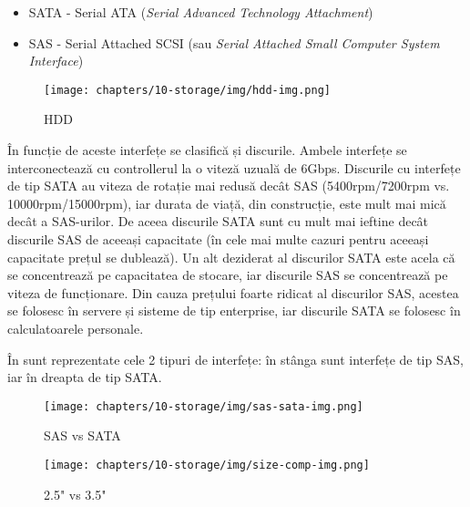 \begin{itemize}
	\item SATA - Serial ATA  (\textit{Serial Advanced Technology Attachment})
	\item SAS - Serial Attached SCSI  (sau
          \textit{Serial Attached Small Computer System Interface})
\end{itemize}

\begin{figure}[!htbp]
	\centering
	\texttt{[image: chapters/10-storage/img/hdd-img.png]}
	\caption{HDD\protect\footnotemark}
	\label{fig:storage:hdd}
\end{figure}


În funcție de aceste interfețe se clasifică și discurile. Ambele interfețe se
interconectează cu controllerul la o viteză uzuală de 6Gbps. Discurile cu
interfețe de tip SATA au viteza de rotație mai redusă decât SAS (5400rpm/7200rpm
vs. 10000rpm/15000rpm), iar durata de viață, din construcție, este mult mai mică
decât a SAS-urilor. De aceea discurile SATA sunt cu mult mai ieftine decât
discurile SAS de aceeași capacitate (în cele mai multe cazuri pentru aceeași
capacitate prețul se dublează). Un alt deziderat al discurilor SATA este acela
că se concentrează pe capacitatea de stocare, iar discurile SAS se concentrează
pe viteza de funcționare. Din cauza prețului foarte ridicat al discurilor SAS,
acestea se folosesc în servere și sisteme de tip enterprise, iar discurile SATA
se folosesc în calculatoarele personale.

În  sunt reprezentate cele 2 tipuri
de interfețe: în stânga sunt interfețe de tip SAS, iar în dreapta de tip SATA.

\begin{figure}[!htbp]
	\centering
	\texttt{[image: chapters/10-storage/img/sas-sata-img.png]}
	\caption{SAS vs SATA\protect\footnotemark}
	\label{fig:storage:sas-sata}
\end{figure}


\begin{figure}[!htbp]
	\centering
	\texttt{[image: chapters/10-storage/img/size-comp-img.png]}
	\caption{2.5" vs 3.5"\protect\footnotemark}
	\label{fig:storage:size-comp}
\end{figure}

